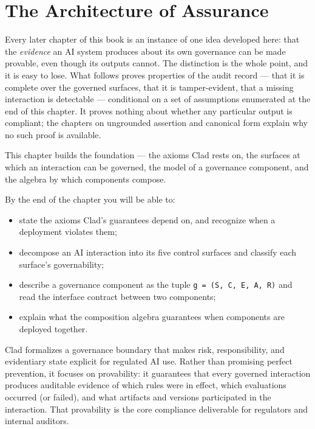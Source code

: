 \chapter{The Architecture of Assurance}
\label{ch:framework}


Every later chapter of this book is an instance of one idea developed here: that
the \emph{evidence} an AI system produces about its own governance can be made
provable, even though its outputs cannot. The distinction is the whole point, and
it is easy to lose. What follows proves properties of the audit record --- that it
is complete over the governed surfaces, that it is tamper-evident, that a missing
interaction is detectable --- conditional on a set of assumptions enumerated at the
end of this chapter. It proves nothing about whether any particular output is
compliant; the chapters on ungrounded assertion and canonical form explain why no
such proof is available.

This chapter builds the foundation --- the
axioms Clad rests on, the surfaces at which an interaction can be governed, the
model of a governance component, and the algebra by which components compose.

By the end of the chapter you will be able to:

\begin{itemize}
  \item state the axioms Clad's guarantees depend on, and recognize when a deployment violates them;
  \item decompose an AI interaction into its five control surfaces and classify each surface's governability;
  \item describe a governance component as the tuple \texttt{g = (S, C, E, A, R)} and read the interface contract between two components;
  \item explain what the composition algebra guarantees when components are deployed together.
\end{itemize}


Clad formalizes a governance boundary that makes risk, responsibility, and evidentiary state explicit for regulated AI use. Rather than promising perfect prevention, it focuses on provability: it guarantees that every governed interaction produces auditable evidence of which rules were in effect, which evaluations occurred (or failed), and what artifacts and versions participated in the interaction. That provability is the core compliance deliverable for regulators and internal auditors.

